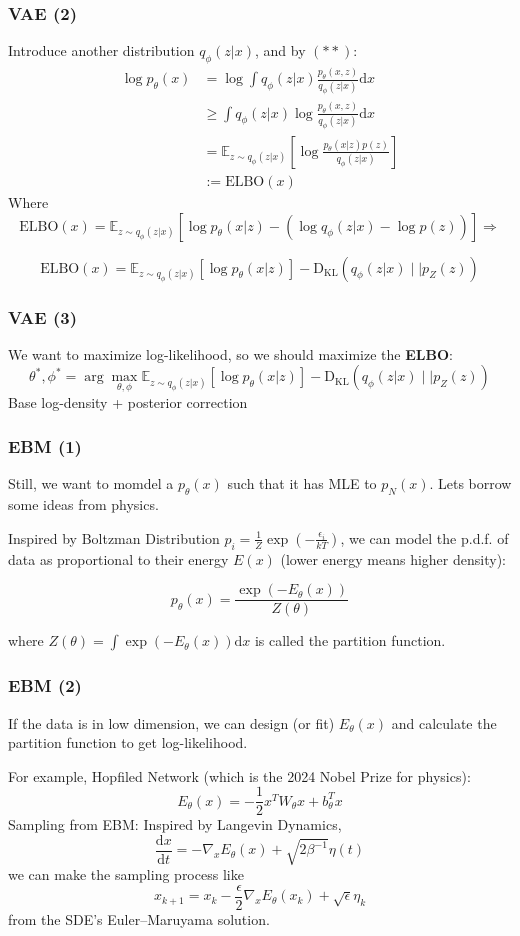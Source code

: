 \documentclass{beamer}
\begin{document}
\begin{frame}[t]
\frametitle{VAE (2)}
Introduce another distribution $q_\phi(z|x)$, and by $(**):$
\begin{align*}
    \log p_\theta(x)&=\log \int q_\phi(z|x)\frac{p_\theta(x,z)}{q_\phi(z|x)}\text{d}x\\
    &\ge\int q_\phi(z|x)\log \frac{p_\theta(x,z)}{q_\phi(z|x)}\text{d}x\\
    &=\mathbb{E}_{z\sim q_\phi(z|x)}\left[\log\frac{p_\theta(x|z)p(z)}{q_\phi(z|x)}\right]\\
    &:=\text{ELBO}(x)
\end{align*}
Where
$$
\text{ELBO}(x)=\mathbb{E}_{z\sim q_\phi(z|x)}[\log p_\theta(x|z)-(\log q_\phi(z|x)-\log p(z))] \Longrightarrow
$$
\begin{tcolorbox}[colback=blue!1!white,
                  colframe=blue!75!black]
$$
\text{ELBO}(x)=\mathbb{E}_{z\sim q_\phi(z|x)}[\log p_\theta(x|z)]-\mathrm{D_{KL}}(q_\phi(z|x)\mid\mid p_Z(z))
$$
\end{tcolorbox}
\end{frame}

\begin{frame}[t]
\frametitle{VAE (3)}
We want to maximize log-likelihood, so we should maximize the \textbf{ELBO}:
$$
\theta^*, \phi^*=\arg\max_{\theta, \phi}\mathbb{E}_{z\sim q_\phi(z|x)}[\log p_\theta(x|z)]-\mathrm{D_{KL}}(q_\phi(z|x)\mid\mid p_Z(z))
$$
\vspace{2em}
Base log-density + posterior correction
\end{frame}

\begin{frame}[t]
\frametitle{EBM (1)}
Still, we want to momdel a $p_\theta(x)$ such that it has MLE to $p_N(x)$. Lets borrow some ideas from physics. 
\vspace{1em}

Inspired by Boltzman Distribution $\displaystyle p_i=\frac{1}{Z}\exp(-\frac{\epsilon_i}{kT})$, we can model the p.d.f. of data as proportional to their energy $E(x)$ (lower energy means higher density):
\begin{tcolorbox}[colback=blue!1!white,
                  colframe=blue!75!black]
$$
p_\theta(x)=\frac{\exp(-E_\theta(x))}{Z(\theta)}
$$
\end{tcolorbox}
where $\displaystyle Z(\theta)=\int \exp(-E_\theta(x))\text{d}x$ is called the partition function.
\end{frame}

\begin{frame}[t]
\frametitle{EBM (2)}
If the data is in low dimension, we can design (or fit) $E_\theta(x)$ and calculate the partition function to get log-likelihood.
\vspace{1em}

For example, Hopfiled Network (which is the 2024 Nobel Prize for physics):
$$
E_\theta(x)=-\frac{1}{2}x^TW_\theta x+b_\theta^Tx
$$
Sampling from EBM: Inspired by Langevin Dynamics,
$$
\frac{\text{d}x}{\text{d}t}=-\nabla_xE_\theta(x)+\sqrt{2\beta^{-1}}\eta(t)
$$
we can make the sampling process like
$$
x_{k+1}=x_k-\frac{\epsilon}{2}\nabla_xE_\theta(x_k)+\sqrt{\epsilon}\eta_k
$$
from the SDE's Euler–Maruyama solution.
\end{frame}
\end{document}
